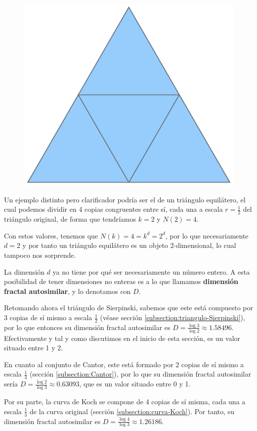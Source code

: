 \begin{figure}
\includegraphics[scale=0.14, trim={0cm 0.35cm 0cm 0.5cm}, clip]{./img/triangulo-dividido.png}
\end{figure}

Un ejemplo distinto pero clarificador podría ser el de un triángulo equilátero, el cual podemos dividir en 4 copias congruentes entre sí, cada una a escala $r=\frac 1 2$ del triángulo original, de forma que tendríamos $k=2$ y $N(2)=4$. 

Con estos valores, tenemos que $N(k)=4=k^d=2^d$, por lo que necesariamente $d=2$ y por tanto un triángulo equilátero es un objeto 2-dimensional, lo cual tampoco nos sorprende.

\begin{observacion}
La dimensión $d$ ya no tiene por qué ser necesariamente un número entero. A esta posibilidad de tener dimensiones no enteras es a lo que llamamos \textbf{dimensión fractal autosimilar}, y lo denotamos con $D$.
\end{observacion}

Retomando ahora el triángulo de Sierpinski, sabemos que este está compuesto por 3 copias de sí mismo a escala $\frac 1 2$ (véase sección \ref{subsection:triangulo-Sierpinski}), por lo que entonces su dimensión fractal autosimilar es $D=\frac{\log 3}{\log 2} \approx 1.58496$. Efectivamente y tal y como discutimos en el inicio de esta sección, es un valor situado entre 1 y 2.

En cuanto al conjunto de Cantor, este está formado por 2 copias de sí mismo a escala $\frac 1 3$ (sección \ref{subsection:Cantor}), por lo que su dimensión fractal autosimilar sería $D=\frac{\log 2}{\log 3} \approx 0.63093$, que es un valor situado entre 0 y 1.

Por su parte, la curva de Koch se compone de 4 copias de sí misma, cada una a escala $\frac 1 3$ de la curva original (sección \ref{subsection:curva-Koch}). Por tanto, su dimensión fractal autosimilar es $D=\frac{\log 4}{\log 3} \approx 1.26186$.
